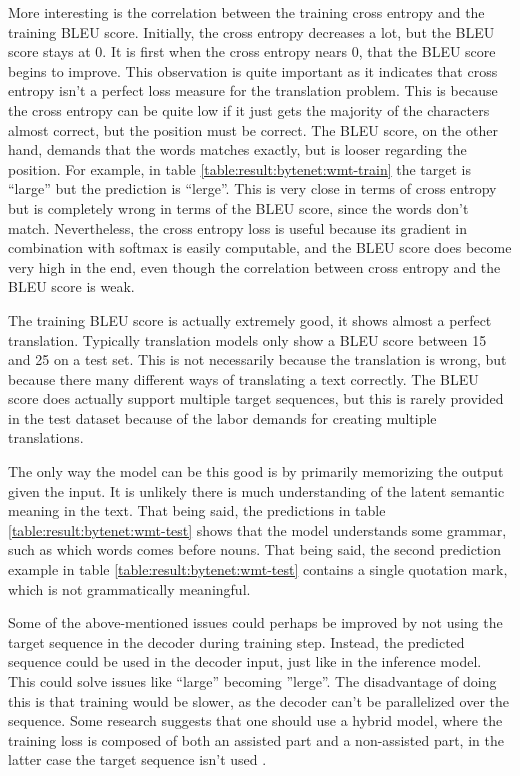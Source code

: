More interesting is the correlation between the training cross entropy and the training BLEU score. Initially, the cross entropy decreases a lot, but the BLEU score stays at 0. It is first when the cross entropy nears 0, that the BLEU score begins to improve. This observation is quite important as it indicates that cross entropy isn't a perfect loss measure for the translation problem. This is because the cross entropy can be quite low if it just gets the majority of the characters almost correct, but the position must be correct. The BLEU score, on the other hand, demands that the words matches exactly, but is looser regarding the position. For example, in table \ref{table:result:bytenet:wmt-train} the target is ``large'' but the prediction is ``lerge''. This is very close in terms of cross entropy but is completely wrong in terms of the BLEU score, since the words don't match. Nevertheless, the cross entropy loss is useful because its gradient in combination with softmax is easily computable, and the BLEU score does become very high in the end, even though the correlation between cross entropy and the BLEU score is weak.

The training BLEU score is actually extremely good, it shows almost a perfect translation. Typically translation models only show a BLEU score between 15 and 25 on a test set. This is not necessarily because the translation is wrong, but because there many different ways of translating a text correctly. The BLEU score does actually support multiple target sequences, but this is rarely provided in the test dataset because of the labor demands for creating multiple translations.

The only way the model can be this good is by primarily memorizing the output given the input. It is unlikely there is much understanding of the latent semantic meaning in the text. That being said, the predictions in table \ref{table:result:bytenet:wmt-test} shows that the model understands some grammar, such as which words comes before nouns. That being said, the second prediction example in table \ref{table:result:bytenet:wmt-test} contains a single quotation mark, which is not grammatically meaningful. 

Some of the above-mentioned issues could perhaps be improved by not using the target sequence in the decoder during training step. Instead, the predicted sequence could be used in the decoder input, just like in the inference model. This could solve issues like ``large'' becoming ''lerge''. The disadvantage of doing this is that training would be slower, as the decoder can't be parallelized over the sequence. Some research suggests that one should use a hybrid model, where the training loss is composed of both an assisted part and a non-assisted part, in the latter case the target sequence isn't used \cite{no-assist-train}.

